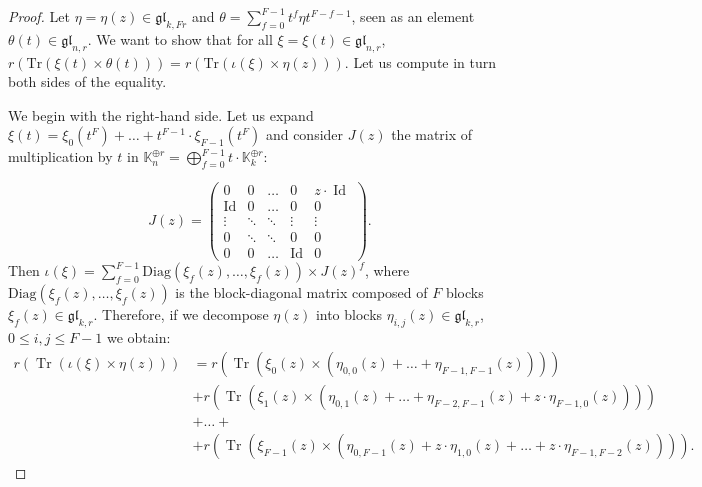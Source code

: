\documentclass[11pt,english]{article}
\numberwithin{equation}{section}
\numberwithin{figure}{section}
\theoremstyle{definition}
\theoremstyle{plain}
\theoremstyle{remark}
\DeclareMathOperator{\Id}{Id}
\DeclareMathOperator{\Tr}{Tr}
\newcommand\KK{\mathbb{K}}
\begin{document}
\begin{proof}

Let $\eta=\eta(z)\in\mathfrak{gl}_{k,Fr}$ and $\theta=\sum_{f=0}^{F-1}t^{f}\eta t^{F-f-1}$,
seen as an element $\theta(t)\in\mathfrak{gl}_{n,r}$. We want to
show that for all $\xi=\xi(t)\in\mathfrak{gl}_{n,r}$, $r(\mathrm{Tr}(\xi(t)\times\theta(t)))=r(\mathrm{Tr}(\iota(\xi)\times\eta(z)))$.
Let us compute in turn both sides of the equality.

We begin with the right-hand side. Let us expand $\xi(t)=\xi_{0}(t^{F})+\ldots+t^{F-1}\cdot\xi_{F-1}(t^{F})$
and consider $J(z)$ the matrix of multiplication by $t$ in $\KK_{n}^{\oplus r}=\bigoplus_{f=0}^{F-1}t\cdot\KK_{k}^{\oplus r}$:

\[
J(z)
=
\left(
\begin{array}{ccccc}
0 & 0 & \ldots & 0 & z\cdot\Id \\
\Id & 0 & \ldots & 0 & 0 \\
\vdots & \ddots & \ddots & \vdots & \vdots \\
0 & \ddots & \ddots & 0 & 0 \\
0 & 0 & \ldots & \Id & 0
\end{array}
\right)
.
\] Then $\iota(\xi)=\sum_{f=0}^{F-1}\mathrm{Diag}(\xi_{f}(z),\ldots,\xi_{f}(z))\times J(z)^{f}$,
where $\mathrm{Diag}(\xi_{f}(z),\ldots,\xi_{f}(z))$ is the block-diagonal
matrix composed of $F$ blocks $\xi_{f}(z)\in\mathfrak{gl}_{k,r}$.
Therefore, if we decompose $\eta(z)$ into blocks $\eta_{i,j}(z)\in\mathfrak{gl}_{k,r}$,
$0\leq i,j\leq F-1$ we obtain:\[
\begin{split}
r(\Tr(\iota(\xi)\times \eta(z))) & = r\left(\Tr (\xi_0(z)\times (\eta_{0,0}(z)+\ldots+\eta_{F-1,F-1}(z)))\right) \\
& +  r\left(\Tr (\xi_1(z)\times (\eta_{0,1}(z)+\ldots+\eta_{F-2,F-1}(z)+z\cdot\eta_{F-1,0}(z)))\right) \\
& +  \ldots  + \\
& + r\left(\Tr (\xi_{F-1}(z)\times (\eta_{0,F-1}(z)+z\cdot\eta_{1,0}(z)+\ldots+z\cdot\eta_{F-1,F-2}(z)))\right) .
\end{split}
\]


\end{proof}
\end{document}
